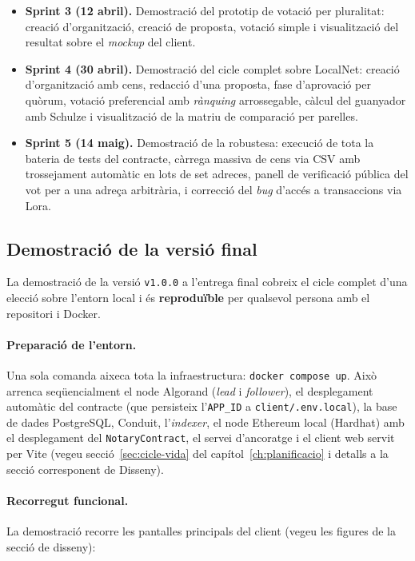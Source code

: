 \begin{itemize}
    \item \textbf{Sprint 3 (12 abril).} Demostració del prototip de votació per pluralitat: creació d'organització,
    creació de proposta, votació simple i visualització del resultat sobre el \emph{mockup} del client.

    \item \textbf{Sprint 4 (30 abril).} Demostració del cicle complet sobre LocalNet: creació d'organització amb cens,
    redacció d'una proposta, fase d'aprovació per quòrum, votació preferencial amb \emph{rànquing} arrossegable, càlcul
    del guanyador amb Schulze i visualització de la matriu de comparació per parelles.

    \item \textbf{Sprint 5 (14 maig).} Demostració de la robustesa: execució de tota la bateria de tests del contracte,
    càrrega massiva de cens via \ac{CSV} amb trossejament automàtic en lots de set adreces, panell de verificació
    pública del vot per a una adreça arbitrària, i correcció del \emph{bug} d'accés a transaccions via Lora.
\end{itemize}

\subsection{Demostració de la versió final}
\label{subsec:demo-final}

La demostració de la versió \texttt{v1.0.0} a l'entrega final cobreix el cicle complet d'una elecció sobre l'entorn
local i és \textbf{reproduïble} per qualsevol persona amb el repositori i Docker.

\paragraph{Preparació de l'entorn.} Una sola comanda aixeca tota la
infraestructura: \texttt{docker compose up}.
Això arrenca seqüencialment el node Algorand (\emph{lead} i \emph{follower}), el desplegament automàtic del contracte
(que persisteix l'\texttt{APP\_ID} a \texttt{client/.env.local}), la base de dades PostgreSQL, Conduit,
l'\emph{indexer}, el node Ethereum local (Hardhat) amb el desplegament del \texttt{NotaryContract}, el servei
d'ancoratge i el client web servit per Vite (vegeu secció~\ref{sec:cicle-vida} del capítol~\ref{ch:planificacio} i
detalls a la secció corresponent de Disseny).

\paragraph{Recorregut funcional.} La demostració recorre les pantalles
principals del client (vegeu les figures de la secció de disseny):

